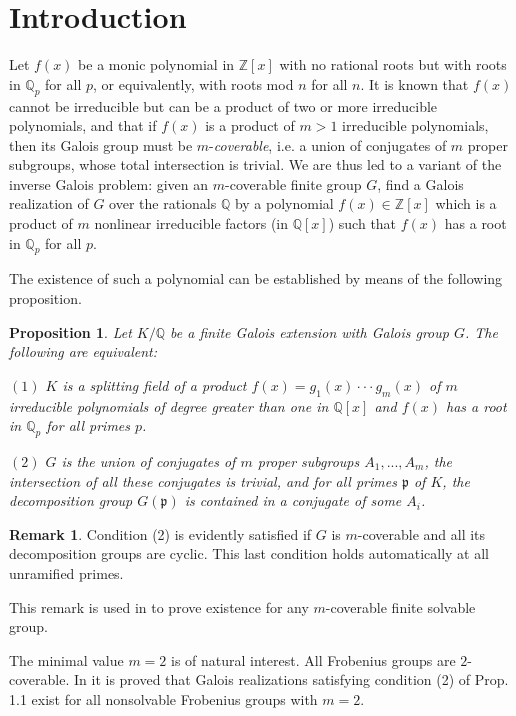 \documentclass[reqno,12pt]{amsart}
\newtheorem{prop}[theorem]{Proposition}
\theoremstyle{remark}
\theoremstyle{definition}
\newtheorem*{rem*}{Remark}
\theoremstyle{citing}
\numberwithin{theorem}{section}
\numberwithin{equation}{section}
\begin{document}
\section{Introduction}
Let $f(x)$ be a monic polynomial in $\mathbb{Z}[x]$ with no
rational roots but with roots in $\mathbb{Q}_p$ for all $p$, or
equivalently, with roots mod $n$ for all $n$. It is known that
$f(x)$ cannot be irreducible but can be a product of two or more
irreducible polynomials, and that if $f(x)$ is a product of $m>1$
irreducible polynomials, then its Galois group must be $m$-{\it coverable}, i.e. a union of
conjugates of $m$ proper subgroups, whose total intersection is trivial.  We are thus led to a variant of the inverse Galois problem: given an $m$-coverable finite group $G$, find a Galois realization of $G$ over the rationals $\mathbb{Q}$ by a polynomial $f(x) \in \mathbb{Z}[x]$ which is a product of $m$ nonlinear irreducible factors (in $\mathbb{Q}[x]$) such that $f(x)$ has a root in $\mathbb{Q}_p$ for all $p$.
\smallskip

 The existence of such a polynomial can be established by means of the following proposition.

\begin{prop}\label{prop:criterion} \cite{sonn} Let $K/\mathbb{Q}$ be a finite Galois extension
with Galois group $G$. The following are equivalent:

$ (1)$ $K$ is a splitting field of a product $f(x)=g_{1}(x)\cdot\cdot\cdot g_{m}(x)$
of $m$ irreducible polynomials of degree greater than one in $\mathbb{Q}[x]$
and $f(x)$ has a root in $\mathbb{Q}_{p}$ for all primes $p$.

$ (2)$ $G$ is the union of conjugates of $m$ proper
subgroups $A_{1},...,A_{m}$, the intersection of all these conjugates
is trivial, and for all primes $\mathfrak{p}$ of $K$, the decomposition
group $G(\mathfrak{p})$ is contained in a conjugate of some $A_{i}$.
\end{prop}

\begin{rem*} Condition (2) is evidently satisfied if $G$ is $m$-coverable and all its decomposition groups are cyclic.  This last condition holds automatically at all unramified primes. \end{rem*}

This remark is used in \cite{sonn} to prove existence for any $m$-coverable finite solvable group.

The minimal value $m=2$ is of natural interest.  All Frobenius groups are $2$-coverable.  In \cite{sonn} it is proved that Galois realizations satisfying condition (2) of Prop. 1.1 exist for all nonsolvable Frobenius groups with $m=2$.
\end{document}
